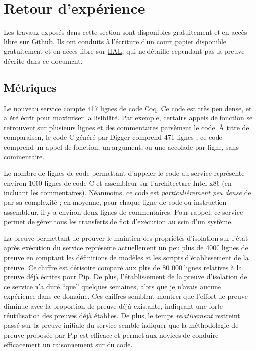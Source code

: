			\newpage

	\section{Retour d'expérience}
	Les travaux exposés dans cette section sont disponibles gratuitement et en accès libre sur \href{https://github.com/2xs/pipcore}{Github}. Ils ont conduits à l'écriture d'un court papier disponible gratuitement et en accès libre sur \href{https://hal.archives-ouvertes.fr/hal-02347481}{HAL}, qui ne détaille cependant pas la preuve décrite dans ce document.

		\subsection{Métriques}

		Le nouveau service compte 417 lignes de code Coq. Ce code est très peu dense, et a été écrit pour maximiser la lisibilité. Par exemple, certains appels de fonction se retrouvent sur plusieurs lignes et des commentaires parsèment le code. À titre de comparaison, le code C généré par Digger comprend 471 lignes ; ce code comprend un appel de fonction, un argument, ou une accolade par ligne, sans commentaire.

		Le nombre de lignes de code permettant d'appeler le code du service représente environ 1000 lignes de code C et assembleur sur l'architecture Intel x86 (en incluant les commentaires). Néanmoins, ce code est \emph{particulièrement peu dense} de par sa complexité ; en moyenne, pour chaque ligne de code ou instruction assembleur, il y a environ deux lignes de commentaires. 
		Pour rappel, ce service permet de gérer tous les transferts de flot d'exécution au sein d'un système. 

		La preuve permettant de prouver le maintien des propriétés d'isolation sur l'état après exécution du service représente actuellement un peu plus de 4000 lignes de preuve en comptant les définitions de modèles et les scripts d'établissement de la preuve. Ce chiffre est dérisoire comparé aux plus de 80 000 lignes relatives à la preuve déjà écrites pour Pip. De plus, l'établissement de la preuve d'isolation de ce service n'a duré ``que'' quelques semaines, alors que je n'avais aucune expérience dans ce domaine. Ces chiffres semblent montrer que l'effort de preuve diminue avec la proportion de preuve déjà existante, indiquant une forte réutilisation des preuves déjà établies. De plus, le temps \emph{relativement} restreint passé sur la preuve initiale du service semble indiquer que la méthodologie de preuve proposée par Pip est efficace et permet aux novices de conduire efficacement un raisonnement sur du code.

